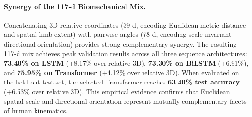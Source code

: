 \documentclass[preprint,12pt]{elsarticle}
\begin{document}
\paragraph{Synergy of the 117-d Biomechanical Mix.} Concatenating 3D relative coordinates (39-d, encoding Euclidean metric distance and spatial limb extent) with pairwise angles (78-d, encoding scale-invariant directional orientation) provides strong complementary synergy. The resulting 117-d mix achieves peak validation results across all three sequence architectures: \textbf{73.40\% on LSTM} (+8.17\% over relative 3D), \textbf{73.30\% on BiLSTM} (+6.91\%), and \textbf{75.95\% on Transformer} (+4.12\% over relative 3D). When evaluated on the held-out test set, the selected Transformer reaches \textbf{63.40\% test accuracy} (+6.53\% over relative 3D). This empirical evidence confirms that Euclidean spatial scale and directional orientation represent mutually complementary facets of human kinematics.

\begin{table}[!t]
\centering
\caption{Validation accuracy (\%) across sequence architectures for feature selection, with held-out test evaluation for the winning Transformer backbone ($\approx 350\text{K}$ parameters).}
\label{tab:table1}
\end{table}
\end{document}
